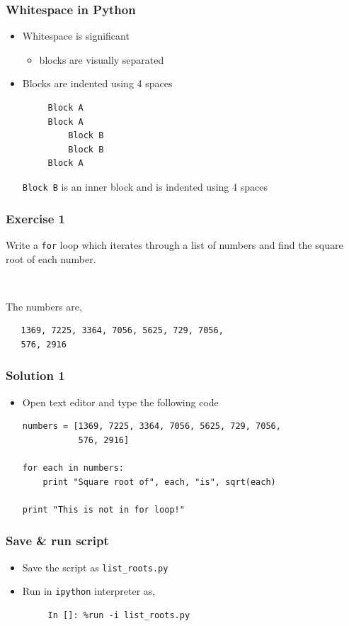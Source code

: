 \documentclass[presentation]{beamer}
\begin{document}
\begin{frame}[fragile]
\frametitle{Whitespace in Python}
\label{sec-4}


\begin{itemize}
\item Whitespace is significant
\begin{itemize}
\item blocks are visually separated
\end{itemize}
\item Blocks are indented using 4 spaces
\begin{verbatim}
     Block A
     Block A
         Block B
         Block B
     Block A
\end{verbatim}

    \verb~Block B~ is an inner block and is indented using 4 spaces
\end{itemize}
\end{frame}
\begin{frame}[fragile]
\frametitle{Exercise 1}
\label{sec-5}

  Write a \verb~for~ loop which iterates through a list of numbers and find
  the square root of each number.
\begin{verbatim}
   
\end{verbatim}

  The numbers are,
\begin{verbatim}
   1369, 7225, 3364, 7056, 5625, 729, 7056, 
   576, 2916
\end{verbatim}
\end{frame}
\begin{frame}[fragile]
\frametitle{Solution 1}
\label{sec-6}


\begin{itemize}
\item Open text editor and type the following code
\lstset{language=Python}
\begin{lstlisting}
numbers = [1369, 7225, 3364, 7056, 5625, 729, 7056, 
           576, 2916]

for each in numbers:
    print "Square root of", each, "is", sqrt(each)

print "This is not in for loop!"
\end{lstlisting}
\end{itemize}
\end{frame}
\begin{frame}[fragile]
\frametitle{Save \& run script}
\label{sec-7}


\begin{itemize}
\item Save the script as \verb~list_roots.py~
\item Run in \verb~ipython~ interpreter as,
\begin{verbatim}
     In []: %run -i list_roots.py
\end{verbatim}

\end{itemize}
\end{frame}
\end{document}
